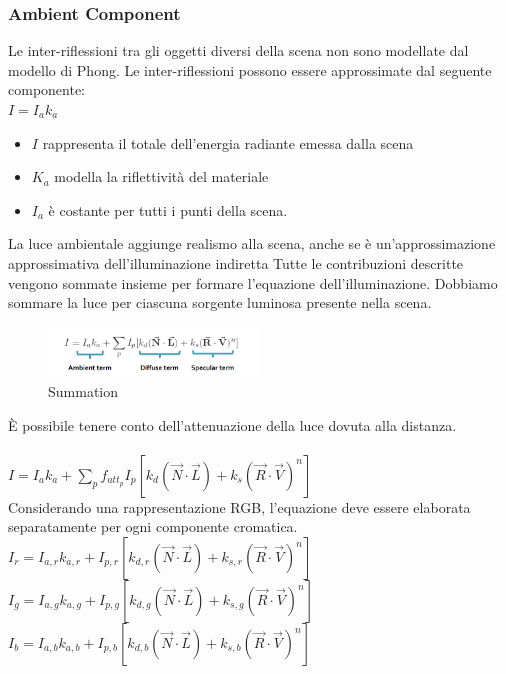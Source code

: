 \subsubsection{Ambient Component}
Le inter-riflessioni tra gli oggetti diversi della scena non sono modellate dal modello di Phong.
Le inter-riflessioni possono essere approssimate dal seguente componente: \\
$I=I_a k_a $\\
\begin{itemize}
    \item $I$ rappresenta il totale dell'energia radiante emessa dalla scena
    \item $K_a$ modella la riflettività del materiale
    \item $I_a$ è costante per tutti i punti della scena.
\end{itemize}
La luce ambientale aggiunge realismo alla scena, anche se è un'approssimazione approssimativa dell'illuminazione indiretta
Tutte le contribuzioni descritte vengono sommate insieme per formare l'equazione dell'illuminazione.
Dobbiamo sommare la luce per ciascuna sorgente luminosa presente nella scena.
\begin{figure}[H]
    \centering
    \includegraphics[width=0.5\textwidth]{images/Summation.png} 
    \caption{Summation}
    \label{fig:immagine}
\end{figure}
È possibile tenere conto dell'attenuazione della luce dovuta alla distanza. \\
\\
$I=I_ak_a+ \sum_{p}{} f_{att_p} I_p[k_d(\vec{N}\cdot\vec{L})+k_s(\vec{R}\cdot\vec{V})^n] $
\\
Considerando una rappresentazione RGB, l'equazione deve essere elaborata separatamente per ogni componente cromatica.\\

$I_r=I_{a,r}k_{a,r}+I_{p,r}[k_{d,r}(\vec{N}\cdot\vec{L})+k_{s,r}(\vec{R}\cdot\vec{V})^n]$\\
$I_g=I_{a,g}k_{a,g}+I_{p,g}[k_{d,g}(\vec{N}\cdot\vec{L})+k_{s,g}(\vec{R}\cdot\vec{V})^n]$\\
$I_b=I_{a,b}k_{a,b}+I_{p,b}[k_{d,b}(\vec{N}\cdot\vec{L})+k_{s,b}(\vec{R}\cdot\vec{V})^n]$\\

